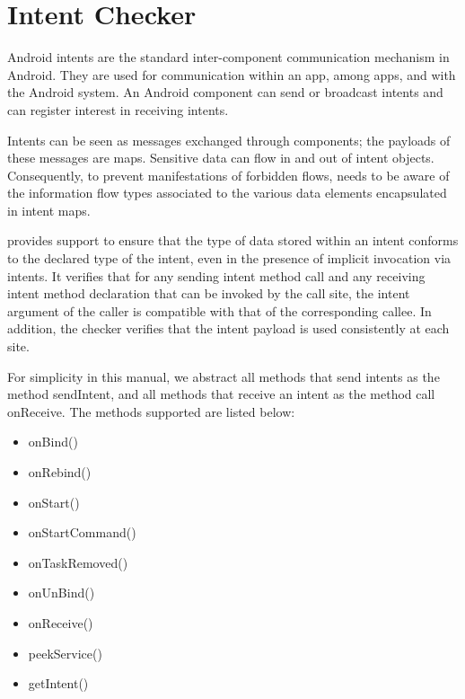 \htmlhr

\newcommand{\tp}[1]{\mathit{typeof}}
\newcommand{\Fix}[1]{\textbf{[[}{\color{red} #1}\textbf{]]}}


\chapter{Intent Checker\label{intent-checker}}

Android intents are the standard inter-component communication
mechanism in Android.  They are used for communication within an app,
among apps, and with the Android system.  An Android component can
send or broadcast intents and can register interest in receiving
intents.

Intents can be seen as messages exchanged through components; the
payloads of these messages are maps.  Sensitive data can flow in and
out of intent objects.  Consequently, to prevent manifestations of
forbidden flows, \theFlowChecker{} needs to be aware of the
information flow types associated to the various data elements
encapsulated in intent maps.

\TheFlowChecker{} provides support to
ensure that the type of data stored within an intent conforms to the
declared type of the intent, even in the presence of implicit
invocation via intents.  It verifies that for any sending intent
method call and any receiving intent method declaration that can be
invoked by the call site, the intent argument of the caller is
compatible with that of the corresponding callee.  In addition, the
checker verifies that the intent payload is used consistently at each
site.

For simplicity in this manual, we abstract all methods that send intents as the
method sendIntent, and all methods that receive an intent as the method call
onReceive. The methods supported are listed below:

\begin{itemize}
\item
onBind()
\item
onRebind()
\item
onStart()
\item
onStartCommand()
\item
onTaskRemoved()
\item
onUnBind()
\item
onReceive()
\item
peekService()
\item
getIntent()
\end{itemize}



